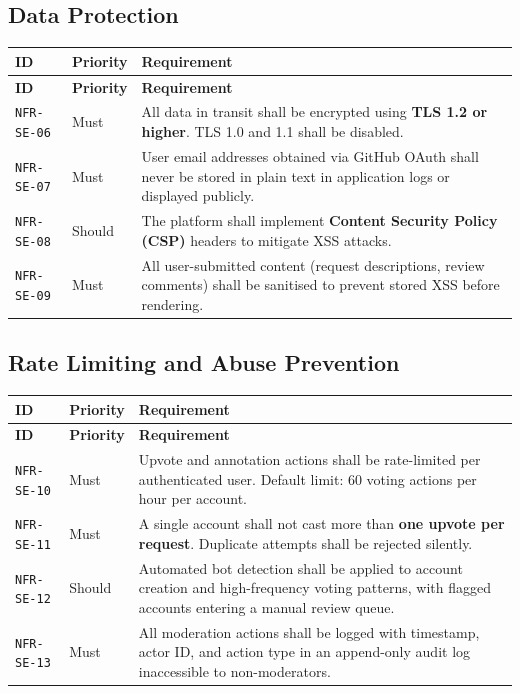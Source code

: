 \documentclass[12pt,a4paper]{article}
\begin{document}
\subsection{Data Protection}
\begin{longtable}{L{2.2cm} L{1.8cm} L{9.3cm}}
  \color{white}\bfseries ID & \color{white}\bfseries Priority & \color{white}\bfseries Requirement \\
  \endfirsthead
  \color{white}\bfseries ID & \color{white}\bfseries Priority & \color{white}\bfseries Requirement \\
  \endhead\hline
  \texttt{NFR-SE-06} & Must   & All data in transit shall be encrypted using \textbf{TLS 1.2 or higher}. TLS 1.0 and 1.1 shall be disabled. \\
  \texttt{NFR-SE-07} & Must   & User email addresses obtained via GitHub OAuth shall never be stored in plain text in application logs or displayed publicly. \\
  \texttt{NFR-SE-08} & Should & The platform shall implement \textbf{Content Security Policy (CSP)} headers to mitigate XSS attacks. \\
  \texttt{NFR-SE-09} & Must   & All user-submitted content (request descriptions, review comments) shall be sanitised to prevent stored XSS before rendering. \\
  \hline
\end{longtable}

\subsection{Rate Limiting and Abuse Prevention}
\begin{longtable}{L{2.2cm} L{1.8cm} L{9.3cm}}
  \color{white}\bfseries ID & \color{white}\bfseries Priority & \color{white}\bfseries Requirement \\
  \endfirsthead
  \color{white}\bfseries ID & \color{white}\bfseries Priority & \color{white}\bfseries Requirement \\
  \endhead\hline
  \texttt{NFR-SE-10} & Must   & Upvote and annotation actions shall be rate-limited per authenticated user. Default limit: 60 voting actions per hour per account. \\
  \texttt{NFR-SE-11} & Must   & A single account shall not cast more than \textbf{one upvote per request}. Duplicate attempts shall be rejected silently. \\
  \texttt{NFR-SE-12} & Should & Automated bot detection shall be applied to account creation and high-frequency voting patterns, with flagged accounts entering a manual review queue. \\
  \texttt{NFR-SE-13} & Must   & All moderation actions shall be logged with timestamp, actor ID, and action type in an append-only audit log inaccessible to non-moderators. \\
  \hline
\end{longtable}
\end{document}

